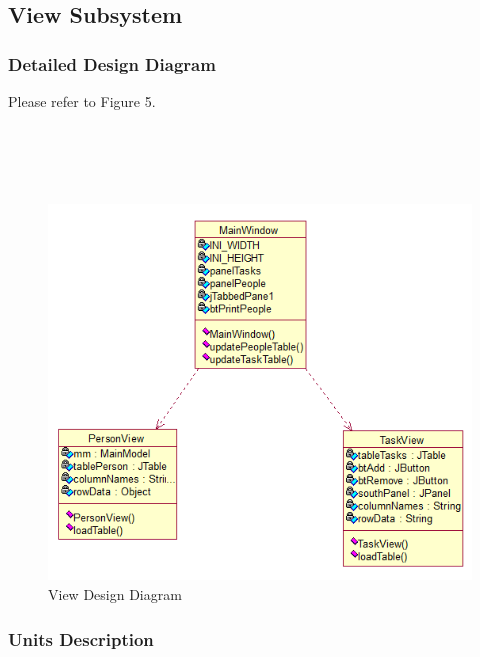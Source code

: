 \documentclass[12pt]{article}
\begin{document}
\subsection{View Subsystem}

\subsubsection{Detailed Design Diagram}

Please refer to Figure 5.\\\\\\\\\\

\begin{figure}[htbp]
\begin{center} \includegraphics[scale=.55]{Diagrams/view_diagram.png} \end{center}
\caption{View Design Diagram}
\label{fig:model-diagram}
\end{figure}

\subsubsection{Units Description}
\end{document}
